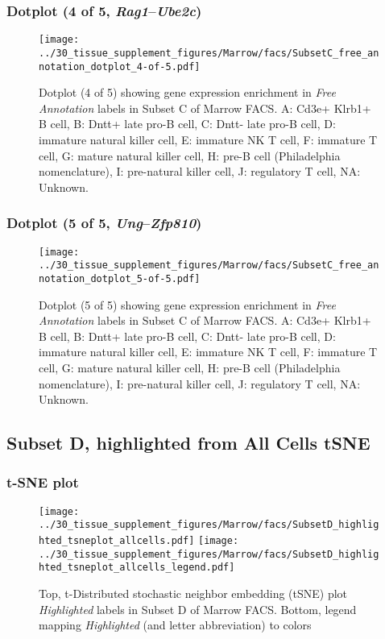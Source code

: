 \clearpage

\subsubsection{Dotplot (4 of 5, \emph{Rag1}--\emph{Ube2c})}
\begin{figure}[h]
\centering
\texttt{[image: ../30\_tissue\_supplement\_figures/Marrow/facs/SubsetC\_free\_annotation\_dotplot\_4-of-5.pdf]}

\caption{ Dotplot (4 of 5)  showing gene expression enrichment in \emph{Free Annotation} labels in Subset C of Marrow FACS. A: Cd3e+ Klrb1+ B cell, B: Dntt+ late pro-B cell, C: Dntt- late pro-B cell, D: immature natural killer cell, E: immature NK T cell, F: immature T cell, G: mature natural killer cell, H: pre-B cell (Philadelphia nomenclature), I: pre-natural killer cell, J: regulatory T cell, NA: Unknown.}
\end{figure}


\clearpage

\subsubsection{Dotplot (5 of 5, \emph{Ung}--\emph{Zfp810})}
\begin{figure}[h]
\centering
\texttt{[image: ../30\_tissue\_supplement\_figures/Marrow/facs/SubsetC\_free\_annotation\_dotplot\_5-of-5.pdf]}

\caption{ Dotplot (5 of 5)  showing gene expression enrichment in \emph{Free Annotation} labels in Subset C of Marrow FACS. A: Cd3e+ Klrb1+ B cell, B: Dntt+ late pro-B cell, C: Dntt- late pro-B cell, D: immature natural killer cell, E: immature NK T cell, F: immature T cell, G: mature natural killer cell, H: pre-B cell (Philadelphia nomenclature), I: pre-natural killer cell, J: regulatory T cell, NA: Unknown.}
\end{figure}


\clearpage
\subsection{Subset D, highlighted from All Cells tSNE}
\subsubsection{t-SNE plot}
\begin{figure}[h]
\centering
\texttt{[image: ../30\_tissue\_supplement\_figures/Marrow/facs/SubsetD\_highlighted\_tsneplot\_allcells.pdf]}
\texttt{[image: ../30\_tissue\_supplement\_figures/Marrow/facs/SubsetD\_highlighted\_tsneplot\_allcells\_legend.pdf]}
\caption{Top, t-Distributed stochastic neighbor embedding (tSNE) plot  \emph{Highlighted} labels in Subset D of Marrow FACS. Bottom, legend mapping \emph{Highlighted} (and letter abbreviation) to colors}
\end{figure}


